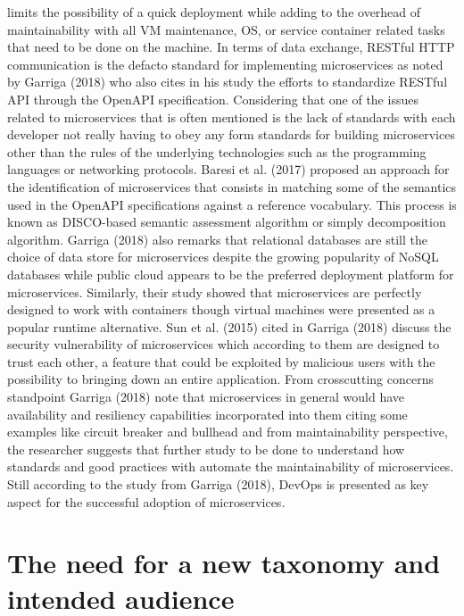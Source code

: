 \documentclass{article}
\begin{document}
limits the possibility of a quick deployment while adding to the overhead of maintainability with all VM maintenance, OS, or service container related tasks that need to be done on the machine.  In terms of data exchange, RESTful HTTP communication is the defacto standard for implementing microservices as noted by Garriga (2018) who also cites in his study the efforts to standardize RESTful API through the OpenAPI specification. Considering that one of the issues related to microservices that is often mentioned is the lack of standards with each developer not really having to obey any form standards for building microservices other than the rules of the underlying technologies such as the programming languages or networking protocols. Baresi et al. (2017) proposed an approach for the identification of microservices that consists in matching some of the semantics used in the OpenAPI specifications against a reference vocabulary. This process is known as DISCO-based semantic assessment algorithm or simply decomposition algorithm. Garriga (2018) also remarks that relational databases are still the choice of data store for microservices despite the growing popularity of NoSQL databases while public cloud appears to be the preferred deployment platform for microservices. Similarly, their study showed that microservices are perfectly designed to work with containers though virtual machines were presented as a popular runtime alternative. Sun et al. (2015) cited in Garriga (2018) discuss the security vulnerability of microservices which according to them are designed to trust each other, a feature that could be exploited by malicious users with the possibility to bringing down an entire application. From crosscutting concerns standpoint Garriga (2018) note that microservices in general would have availability and resiliency capabilities incorporated into them citing some examples like circuit breaker and bullhead and from maintainability perspective, the researcher suggests that further study to be done to understand how standards and good practices with automate the maintainability of microservices. Still according to the study from Garriga (2018), DevOps is presented as key aspect for the successful adoption of microservices.

\section{The need for a new taxonomy and intended audience}
\end{document}
